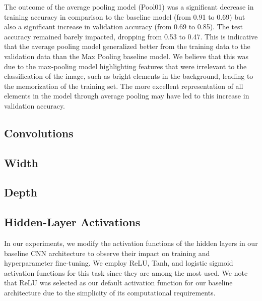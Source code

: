 \documentclass{article}
\begin{document}
The outcome of the average pooling model (Pool01) was a significant decrease in training accuracy in comparison to the baseline model (from 0.91 to 0.69) but also a significant increase in validation accuracy (from 0.69 to 0.85). The test accuracy remained barely impacted, dropping from 0.53 to 0.47. This is indicative that the average pooling model generalized better from the training data to the validation data than the Max Pooling baseline model. We believe that this was due to the max-pooling model highlighting features that were irrelevant to the classification of the image, such as bright elements in the background, leading to the memorization of the training set. The more excellent representation of all elements in the model through average pooling may have led to this increase in validation accuracy.


\subsection{Convolutions}



\subsection{Width}
\subsection{Depth}
\subsection{Hidden-Layer Activations}
In our experiments, we modify the activation functions of the hidden layers in our baseline CNN architecture to observe their impact on training and hyperparameter fine-tuning. We employ ReLU, Tanh, and logistic sigmoid activation functions for this task since they are among the most used. We note that ReLU was selected as our default activation function for our baseline architecture due to the simplicity of its computational requirements.
\end{document}
